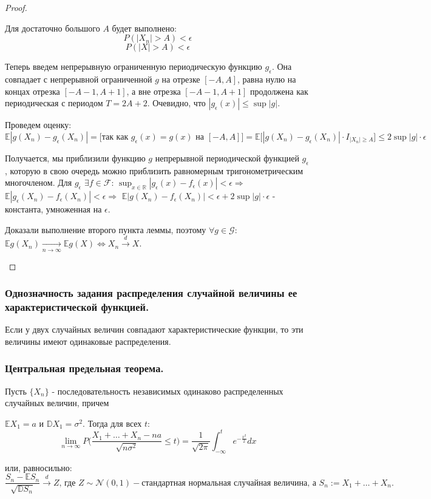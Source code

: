 \begin{proof}
\begin{itemize}
        Для достаточно большого $A$ будет выполнено:
        $$P(|X_n| > A) < \epsilon$$
        $$P(|X| > A) < \epsilon$$
        
        Теперь введем непрерывную ограниченную периодическую функцию $g_{\epsilon}$. Она совпадает с непрерывной ограниченной $g$ на отрезке $[-A, A]$, равна нулю на концах отрезка $[-A - 1, A + 1]$, а вне отрезка $[-A - 1, A + 1]$ продолжена как периодическая с периодом $T = 2A + 2$. Очевидно, что $|g_{\epsilon}(x)| \leq \sup|g|$.
        
        Проведем оценку:
        $$\mathbb{E}|g(X_n) - g_{\epsilon}(X_n)| = \Big[ \textrm{так как } g_{\epsilon}(x) = g(x) \textrm{ на } [-A, A] \Big] = \mathbb{E}\big[ |g(X_n) - g_{\epsilon}(X_n)| \cdot I_{|X_n| \geq A} \big] \leq 2\sup|g| \cdot \epsilon$$
        
        Получается, мы приблизили функцию $g$ непрерывной периодической функцией $g_{\epsilon}$, которую в свою очередь можно приблизить равномерным тригонометрическим многочленом. Для $g_{\epsilon}$ $\exists f \in \mathcal{F}$: $\sup_{x \in \mathbb{R}}|g_{\epsilon}(x) - f_{\epsilon}(x)| < \epsilon \Rightarrow$ $\mathbb{E}|g_{\epsilon}(X_n) - f_{\epsilon}(X_n)| < \epsilon \Rightarrow$ $\mathbb{E}|g(X_n) - f_{\epsilon}(X_n)| < \epsilon + 2\sup|g| \cdot \epsilon$ - константа, умноженная на $\epsilon$.
        
        Доказали выполнение второго пункта леммы, поэтому $\forall g \in \mathcal{G}$: $\mathbb{E}g(X_n) \xrightarrow[n \rightarrow \infty]{} \mathbb{E}g(X) \Leftrightarrow X_n \xrightarrow{d} X$.
    \end{itemize}
\end{proof}

\subsubsection{Однозначность задания распределения случайной величины ее характеристической функцией.}

\begin{theorem*}
    Если у двух случайных величин совпадают характеристические функции, то эти величины имеют одинаковые распределения.
\end{theorem*}

\subsubsection{Центральная предельная теорема.}

\begin{theorem*}
    Пусть $\{X_n\}$ - последовательность независимых одинаково распределенных случайных величин, причем
    
    $\mathbb{E}X_1 = a$ и $\mathbb{D}X_1 = \sigma^2$. Тогда для всех $t$:
    $$\lim_{n \to \infty} P \Big( \frac{X_1 + \ldots + X_n - na}{\sqrt{n\sigma^2}} \leq t \Big) = \frac{1}{\sqrt{2\pi}} \int^{t}_{-\infty} e^{-\frac{x^2}{2}} dx$$
    
    или, равносильно:
    $$\frac{S_n - \mathbb{E}S_n}{\sqrt{\mathbb{D}S_n}} \xrightarrow{d} Z \textrm{, где } Z \sim \mathcal{N}(0, 1) - \textrm{стандартная нормальная случайная величина, а } S_n := X_1 + \ldots + X_n \textrm{.}$$
\end{theorem*}
